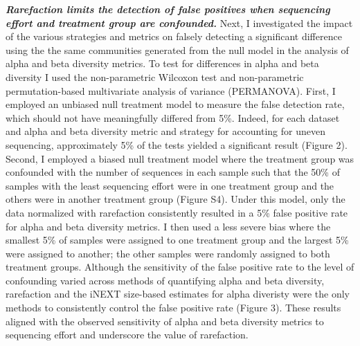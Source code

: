 \documentclass[
]{article}
\begin{document}
\textbf{\emph{Rarefaction limits the detection of false positives when
sequencing effort and treatment group are confounded.}} Next, I
investigated the impact of the various strategies and metrics on falsely
detecting a significant difference using the the same communities
generated from the null model in the analysis of alpha and beta
diversity metrics. To test for differences in alpha and beta diversity I
used the non-parametric Wilcoxon test and non-parametric
permutation-based multivariate analysis of variance (PERMANOVA). First,
I employed an unbiased null treatment model to measure the false
detection rate, which should not have meaningfully differed from 5\%.
Indeed, for each dataset and alpha and beta diversity metric and
strategy for accounting for uneven sequencing, approximately 5\% of the
tests yielded a significant result (Figure 2). Second, I employed a
biased null treatment model where the treatment group was confounded
with the number of sequences in each sample such that the 50\% of
samples with the least sequencing effort were in one treatment group and
the others were in another treatment group (Figure S4). Under this
model, only the data normalized with rarefaction consistently resulted
in a 5\% false positive rate for alpha and beta diversity metrics. I
then used a less severe bias where the smallest 5\% of samples were
assigned to one treatment group and the largest 5\% were assigned to
another; the other samples were randomly assigned to both treatment
groups. Although the sensitivity of the false positive rate to the level
of confounding varied across methods of quantifying alpha and beta
diversity, rarefaction and the iNEXT size-based estimates for alpha
diveristy were the only methods to consistently control the false
positive rate (Figure 3). These results aligned with the observed
sensitivity of alpha and beta diversity metrics to sequencing effort and
underscore the value of rarefaction.
\end{document}
